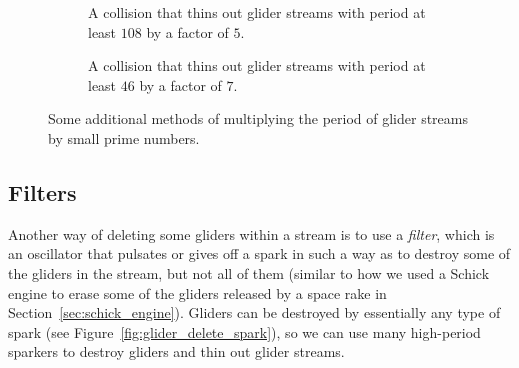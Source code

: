 \begin{figure}[!htb]
	\centering
	\begin{subfigure}{.48\textwidth}
		\centering
		\caption{A collision that thins out glider streams with period at least $108$ by a factor of $5$.}
		\label{fig:glider_delete4}
	\end{subfigure} \hfill %
	\begin{subfigure}{.48\textwidth}
		\centering
		\caption{A collision that thins out glider streams with period at least $46$ by a factor of $7$.}
		\label{fig:glider_delete6}
	\end{subfigure}
	\caption{Some additional methods of multiplying the period of glider streams by small prime numbers.}\label{fig:glider_delete_prime}
\end{figure}


\subsection{Filters}\label{sec:filters}

Another way of deleting some gliders within a stream is to use a \emph{filter}, which is an oscillator that pulsates or gives off a spark in such a way as to destroy some of the gliders in the stream, but not all of them (similar to how we used a Schick engine to erase some of the gliders released by a space rake in Section~\ref{sec:schick_engine}). Gliders can be destroyed by essentially any type of spark (see Figure~\ref{fig:glider_delete_spark}), so we can use many high-period sparkers to destroy gliders and thin out glider streams.

